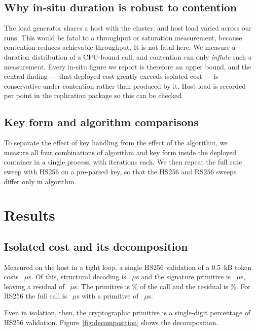 \documentclass[pdflatex,sn-basic,twocolumn]{sn-jnl}
\begin{document}
\subsection{Why in-situ duration is robust to contention}

The load generator shares a host with the cluster, and host load varied across
our runs. This would be fatal to a throughput or saturation measurement, because
contention reduces achievable throughput. It is not fatal here. We measure a
duration distribution of a CPU-bound call, and contention can only \emph{inflate}
such a measurement. Every in-situ figure we report is therefore an upper bound,
and the central finding --- that deployed cost greatly exceeds isolated cost ---
is conservative under contention rather than produced by it. Host load is
recorded per point in the replication package so this can be checked.

\subsection{Key form and algorithm comparisons}

To separate the effect of key handling from the effect of the algorithm, we
measure all four combinations of algorithm and key form inside the deployed
container in a single process, with \KfHsStringIterations{} iterations each. We
then repeat the full rate sweep with HS256 on a pre-parsed key, so that the
HS256 and RS256 sweeps differ only in algorithm.

\section{Results}\label{sec:results}

\subsection{Isolated cost and its decomposition}

Measured on the host in a tight loop, a single HS256 validation of a 0.5~kB
token costs \MbHsHalfKbFull~$\mu$s. Of this, structural decoding is
\MbHsHalfKbDecode~$\mu$s and the signature primitive is
\MbHsHalfKbPrimitive~$\mu$s, leaving a residual of \MbHsHalfKbResidual~$\mu$s.
The primitive is \MbHsHalfKbPrimitivePct\% of the call and the residual is
\MbHsHalfKbResidualPct\%. For RS256 the full call is \MbRsHalfKbFull~$\mu$s with
a primitive of \MbRsHalfKbPrimitive~$\mu$s.

Even in isolation, then, the cryptographic primitive is a single-digit
percentage of HS256 validation. Figure~\ref{fig:decomposition} shows the
decomposition.
\end{document}
